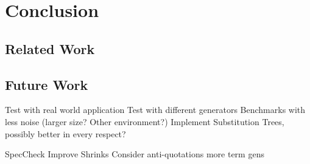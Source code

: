\chapter{Conclusion}
\section{Related Work}

\section{Future Work}
Test with real world application
Test with different generators
Benchmarks with less noise (larger size? Other environment?)
Implement Substitution Trees, possibly better in every respect?

SpecCheck
Improve Shrinks
Consider anti-quotations
more term gens
